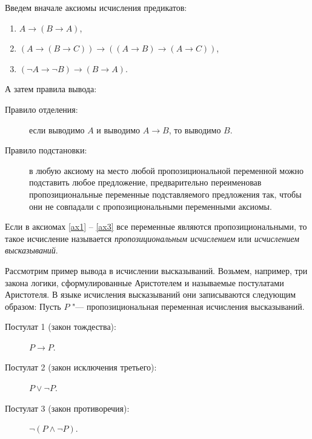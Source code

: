 \documentclass[b5paper,11pt]{book}
\numberwithin{Def}{section}
\numberwithin{Th}{chapter}
\numberwithin{St}{chapter}
\begin{document}
	Введем вначале аксиомы исчисления предикатов:
	\begin{enumerate}
		\item\label{ax1} $A\rightarrow (B\rightarrow A)$,
		\item\label{ax2} $(A\rightarrow (B\rightarrow C))\rightarrow ((A\rightarrow B)\rightarrow(A\rightarrow C))$,
		\item\label{ax3} $(\neg A\rightarrow \neg B)\rightarrow(B\rightarrow A)$.
	\end{enumerate}  
	А затем правила вывода:
	\begin{description}
		\item[Правило отделения:] если выводимо $A$ и выводимо $A\rightarrow B$, то выводимо $B$.
		\item[Правило подстановки:] в любую аксиому на место любой пропозициональной переменной можно подставить любое предложение, предварительно переименовав пропозициональные переменные подставляемого предложения так, чтобы они не совпадали с пропозициональными переменными аксиомы.
	\end{description}
	
	Если в аксиомах \ref{ax1} -- \ref{ax3} все переменные являются пропозициональными, то такое исчисление называется \textit{пропозициональным исчислением} или \textit{исчислением высказываний}.
	
	Рассмотрим пример вывода в исчислении высказываний. Возьмем, например, три закона логики, сформулированные Аристотелем и называемые постулатами Аристотеля. В языке исчисления высказываний они записываются следующим образом: 
	Пусть $P$ "--- пропозициональная переменная исчисления высказываний.
	\begin{description}
		\item[Постулат 1 (закон тождества):] $P\rightarrow P$.
		\item[Постулат 2 (закон исключения третьего):] $P\vee\neg P$.
		\item[Постулат 3 (закон противоречия):] $\neg(P\wedge\neg P)$.
	\end{description}
	
\end{document}
